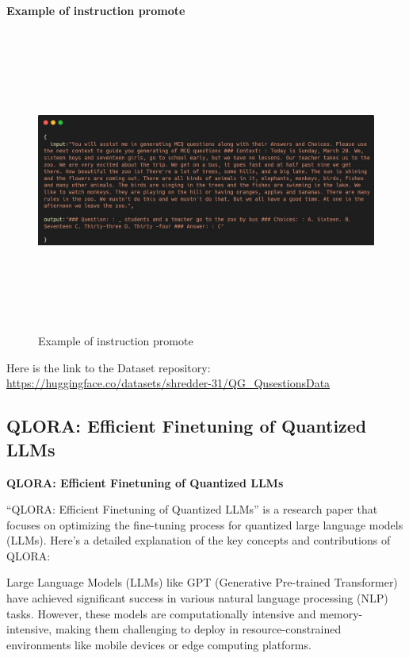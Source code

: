 \hfill \break
\textbf{Example of instruction promote} \\

\begin{center}
\begin{figure}[h!]
\centering
\includegraphics[scale=0.5,width=20.75cm,height=10cm, center]{figures/instruction dataset.png}
\caption{ Example of instruction promote }
\end{figure}
\end{center}

\hfill \break
Here is the link to the Dataset repository: \url{https://huggingface.co/datasets/shredder-31/QG_QusestionsData}


\newpage
\subsection{QLORA: Efficient Finetuning of Quantized LLMs} 

\hfill \break
\textbf{QLORA: Efficient Finetuning of Quantized LLMs}

\hfill \break
``QLORA: Efficient Finetuning of Quantized LLMs'' \cite{dettmers2024qlora} is a research paper that focuses on optimizing the fine-tuning process for quantized large language models (LLMs). Here’s a detailed explanation of the key concepts and contributions of QLORA:


\hfill \break
Large Language Models (LLMs) like GPT (Generative Pre-trained Transformer) have achieved significant success in various natural language processing (NLP) tasks. However, these models are computationally intensive and memory-intensive, making them challenging to deploy in resource-constrained environments like mobile devices or edge computing platforms.

